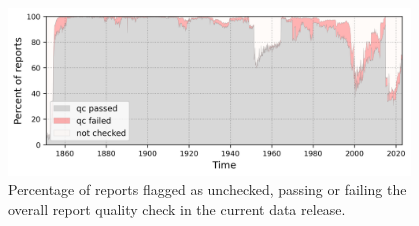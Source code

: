 \begin{figure}[htp]
    \includegraphics[width=0.95\textwidth]{resources/report_quality-ts.png}
    \caption{Percentage of reports flagged as unchecked, passing or failing the overall report quality check in the current data release.\\}
    \label{fig:report_qc}
\end{figure}
